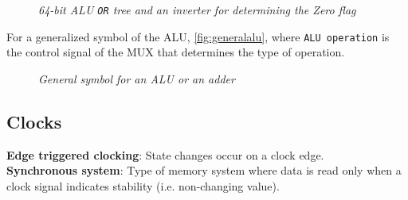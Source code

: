 \documentclass[11pt]{article}
\begin{document}
\begin{figure}[htbp]
    \centering
    \caption{\textit{64-bit ALU \texttt{OR} tree and an inverter for determining the Zero flag}}
    \label{fig:64aluzero}
\end{figure}

For a generalized symbol of the ALU, \autoref{fig:generalalu}, where \texttt{ALU operation} is the control signal of the MUX that determines the type of operation.

\begin{figure}[htbp]
    \centering
    \caption{\textit{General symbol for an ALU or an adder}}
    \label{fig:generalalu}
\end{figure}

\pagebreak

\subsection*{Clocks}

\begin{tcolorbox}[
    enhanced,
    attach boxed title to top left={xshift=6mm,yshift=-1.5mm},
    colback=moonstoneblue!20,
    colframe=moonstoneblue,
    colbacktitle=moonstoneblue,
    title=Clocking methodology semantics,
    fonttitle=\bfseries\color{white},
    boxed title style={size=small,colframe=moonstoneblue,sharp corners},
    sharp corners,
]
    {\color{moondark}\textbf{Edge triggered clocking}}: State changes occur on a clock edge. \\
    {\color{moondark}\textbf{Synchronous system}}: Type of memory system where data is read only when a clock signal indicates stability (i.e. non-changing value).
\end{tcolorbox}
\end{document}
